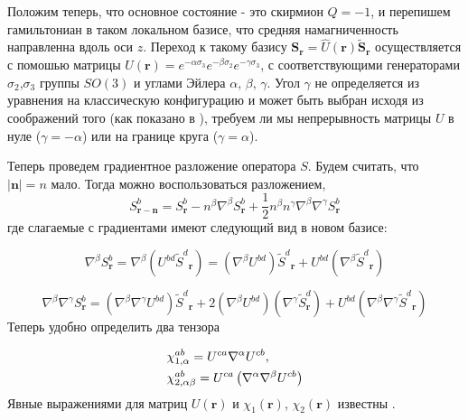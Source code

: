 \documentclass[a4paper,article,14pt]{extarticle}
\begin{document}
Положим теперь, что основное состояние - это скирмион $Q=-1$, и перепишем гамильтониан в таком локальном базисе, что средняя намагниченность направленна вдоль оси $z$.
Переход к такому базису ${\mathbf{S}}_{\mathbf{r}} = \hat U\left( \mathbf{r} \right)\tilde { \mathbf{S}}_{\mathbf{r}}$ осуществляется с помошью матрицы $\hat U(\mathbf{r}) = e^{-\alpha \sigma_3}e^{-\beta \sigma_2}e^{-\gamma \sigma_3}$, с соответствующими генераторами $\sigma_2$,$\sigma_3$ группы $SO(3)$ и углами Эйлера $\alpha$, $\beta$, $\gamma$. Угол $\gamma$ не определяется из уравнения на классическую конфигурацию и может быть выбран исходя из соображений того (как показано в \cite{paper:aristov}), требуем ли мы непрерывность матрицы $U$ в нуле ($\gamma = -\alpha$) или на границе круга ($\gamma = \alpha$).

Теперь проведем градиентное разложение оператора $S$. Будем считать, что $|\mathbf{n}|=n$ мало. Тогда можно воспользоваться разложением, $${S}_{{\mathbf{r}} - {\mathbf{n}}}^b = {S}_{\mathbf{r}}^b - {n^\beta }{\nabla ^\beta }{S}_{\mathbf{r}}^b + \frac{1}{2}{n^\beta }{n^\gamma }{\nabla ^\beta }{\nabla ^\gamma }{S}_{\mathbf{r}}^b$$ где слагаемые с градиентами имеют следующий вид в новом базисе:

\[{\nabla ^\beta }S_{\mathbf{r}}^b = {\nabla ^\beta }\left( {{U^{bd}}{{\tilde S}^d}_{\mathbf{r}}} \right) = \left( {{\nabla ^\beta }{U^{bd}}} \right){{\tilde S}^d}_{\mathbf{r}} + {U^{bd}}\left( {{\nabla ^\beta }{{\tilde S}^d}_{\mathbf{r}}} \right)\]

	
\[{\nabla ^\beta }{\nabla ^\gamma }S_{\mathbf{r}}^b = \left( {{\nabla ^\beta }{\nabla ^\gamma }{U^{bd}}} \right){\tilde S^d}_{\mathbf{r}} + 2\left( {{\nabla ^\beta }{U^{bd}}} \right)\left( {{\nabla ^\gamma }\tilde S_{\mathbf{r}}^d} \right) + {U^{bd}}\left( {{\nabla ^\beta }{\nabla ^\gamma }{{\tilde S}^d}_{\mathbf{r}}} \right)\]
Теперь удобно определить два тензора

\begin{eqnarray}
\label{eq:chi}
\begin{gathered}
  \chi _{1,\alpha }^{ab} = {U^{ca}}{\nabla ^\alpha }{U^{cb}}, \hfill \\
  \chi _{2,\alpha \beta }^{ab} = {U^{ca}}\left( {{\nabla ^\alpha }{\nabla ^\beta }{U^{cb}}} \right) \hfill \\ 
\end{gathered}
\end{eqnarray}
Явные выражениями для матриц $U(\mathbf{r})$ и $\chi_1(\mathbf{r})$, $\chi_2(\mathbf{r})$ известны \cite{paper:aristov}.
\end{document}

